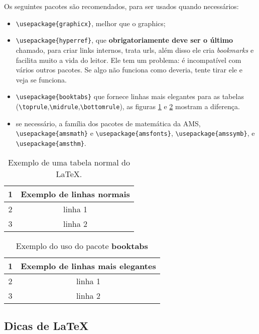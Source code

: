 \documentclass{article}
\begin{document}
Os seguintes pacotes são recomendados, para ser usados quando necessários:    
        
\begin{itemize}
    \item \verb!\usepackage{graphicx}!, melhor que o graphics;
    \item \verb!\usepackage{hyperref}!, que \textbf{obrigatoriamente deve ser o último} chamado, para criar links internos, trata urls, além disso ele cria \textit{bookmarks} e facilita muito a vida do leitor. Ele tem um problema: é incompatível com vários outros pacotes. Se algo não funciona como deveria, tente tirar ele e veja se funciona.
    \item \verb!\usepackage{booktabs}! que fornece linhas mais elegantes para as tabelas (\verb!\toprule!,\verb!\midrule!,\verb!\bottomrule!), as figuras \ref{tab:tab2} e \ref{tab:tab1} mostram a diferença.
    \item se necessário, a família dos pacotes de matemática da AMS, \verb!\usepackage{amsmath}! e
    \verb!\usepackage{amsfonts}!, \verb!\usepackage{amssymb}!, e \verb!\usepackage{amsthm}!.
\end{itemize}

\begin{table}[htb]
    \centering
        \caption{Exemplo de uma tabela normal do \LaTeX .}
    \begin{tabular}{cc}
    \hline
        1 & Exemplo de linhas normais   \\
        \hline
        2 & linha 1\\
        3 & linha 2\\
        \hline
    \end{tabular}

    \label{tab:tab2}
\end{table}

\begin{table}[htb]
    \centering
        \caption{Exemplo do uso do pacote \textbf{booktabs} }
    \begin{tabular}{cc}
    \toprule
        1 & Exemplo de linhas mais elegantes   \\
        \midrule
        2 & linha 1\\
        3 & linha 2\\
        \bottomrule
    \end{tabular}

    \label{tab:tab1}
\end{table}

\subsection{Dicas de \LaTeX}
\end{document}
